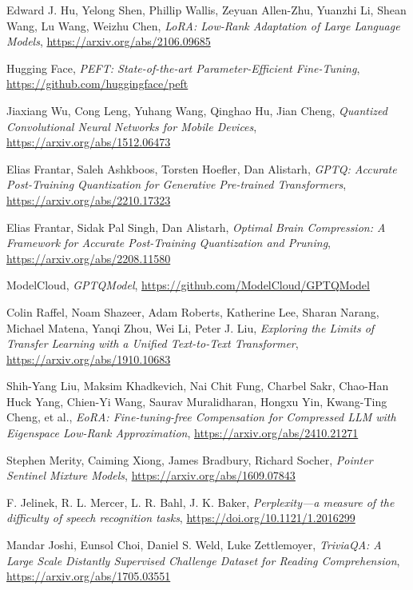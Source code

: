 \begin{thebibliography}{9}
	Edward J. Hu, Yelong Shen, Phillip Wallis, Zeyuan Allen-Zhu, Yuanzhi Li, Shean Wang, Lu Wang, Weizhu Chen,
	\textit{LoRA: Low-Rank Adaptation of Large Language Models},
	\url{https://arxiv.org/abs/2106.09685}

	Hugging Face,
	\textit{PEFT: State-of-the-art Parameter-Efficient Fine-Tuning},
	\url{https://github.com/huggingface/peft}

	Jiaxiang Wu, Cong Leng, Yuhang Wang, Qinghao Hu, Jian Cheng,
	\textit{Quantized Convolutional Neural Networks for Mobile Devices},
	\url{https://arxiv.org/abs/1512.06473}

	Elias Frantar, Saleh Ashkboos, Torsten Hoefler, Dan Alistarh,
	\textit{GPTQ: Accurate Post-Training Quantization for Generative Pre-trained Transformers},
	\url{https://arxiv.org/abs/2210.17323}

	Elias Frantar, Sidak Pal Singh, Dan Alistarh,
	\textit{Optimal Brain Compression: A Framework for Accurate Post-Training Quantization and Pruning},
	\url{https://arxiv.org/abs/2208.11580}

	ModelCloud,
	\textit{GPTQModel},
	\url{https://github.com/ModelCloud/GPTQModel}

	Colin Raffel, Noam Shazeer, Adam Roberts, Katherine Lee, Sharan Narang, Michael Matena, Yanqi Zhou, Wei Li, Peter J. Liu,
	\textit{Exploring the Limits of Transfer Learning with a Unified Text-to-Text Transformer},
	\url{https://arxiv.org/abs/1910.10683}

	Shih-Yang Liu, Maksim Khadkevich, Nai Chit Fung, Charbel Sakr, Chao-Han Huck Yang, Chien-Yi Wang, Saurav Muralidharan, Hongxu Yin, Kwang-Ting Cheng, et al.,
	\textit{EoRA: Fine-tuning-free Compensation for Compressed LLM with Eigenspace Low-Rank Approximation},
	\url{https://arxiv.org/abs/2410.21271}

	Stephen Merity, Caiming Xiong, James Bradbury, Richard Socher,
	\textit{Pointer Sentinel Mixture Models},
	\url{https://arxiv.org/abs/1609.07843}

	F. Jelinek, R. L. Mercer, L. R. Bahl, J. K. Baker,
	\textit{Perplexity—a measure of the difficulty of speech recognition tasks},
	\url{https://doi.org/10.1121/1.2016299}

	Mandar Joshi, Eunsol Choi, Daniel S. Weld, Luke Zettlemoyer,
	\textit{TriviaQA: A Large Scale Distantly Supervised Challenge Dataset for Reading Comprehension},
	\url{https://arxiv.org/abs/1705.03551}


\end{thebibliography}
